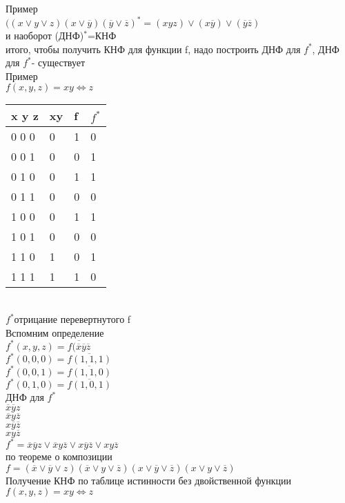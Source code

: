 \documentclass{article}
\begin{document}
Пример\\
$((x\vee y\vee z)(x\vee \overline{y})(\overline{y}\vee \overline{z})^*=(xyz)\vee(x\overline{y})\vee(\overline{y}\overline{z})$\\
и наоборот (ДНФ)$^*$=КНФ\\
итого, чтобы получить КНФ для функции f, надо построить ДНФ для $f^*$, ДНФ для $f^*$- существует\\
Пример\\
$f(x,y,z)=xy\Leftrightarrow z$\\
\begin{tabular}{l|l|l|l}
 x y z&xy&f&$f^*$\\
\hline
0 0 0&  0 & 1 & 0\\
0 0 1&  0 & 0 & 1\\
0 1 0&  0 & 1 & 1\\
0 1 1&  0 & 0 & 0\\
1 0 0&  0 & 1 & 1\\
1 0 1&  0 & 0 & 0\\
1 1 0&  1 & 0 & 1\\
1 1 1&  1 & 1 & 0\\
\end{tabular}\\
$f^*$отрицание перевертнутого f\\
Вспомним определение\\
$f^*(x,y,z)=\overline{f(\overline{x} \overline{y} \overline{z}}$\\
$f^*(0,0,0)=\overline{f(1,1,1)}$\\
$f^*(0,0,1)=\overline{f(1,1,0)}$\\
$f^*(0,1,0)=\overline{f(1,0,1)}$\\
ДНФ для $f^*$\\
$\overline{x} \overline{y} z$\\
$\overline{x} y \overline{z}$\\
$x \overline{y} \overline{z}$\\
$x y \overline{z}$\\
$f^*=\overline{x} \overline{y} z \vee \overline{x} y \overline{z}\vee x \overline{y} \overline{z}\vee  x y \overline{z}$\\
по теореме о композиции\\
$f=(\overline{x} \vee\overline{y}\vee z)( \overline{x}\vee y \vee\overline{z})( x\vee \overline{y}\vee \overline{z})( x\vee y\vee \overline{z})$\\
Получение КНФ по таблице истинности без двойственной функции\\
$f(x,y,z)=xy\Leftrightarrow z$\\
\end{document}
